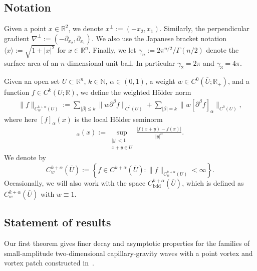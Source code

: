 \documentclass[11pt,reqno]{amsart}
\newcommand{\jbracket}[1]{\langle{#1}\rangle}
\newcommand\bdd{{\mathrm{bdd}}}
\newcommand{\R}{\mathbb{R}}
\newcommand{\n}[2][]{#1\lVert #2 #1\rVert}
\newcommand{\abs}[2][]{#1\lvert #2 #1\rvert}
\theoremstyle{plain}
\theoremstyle{remark}
\numberwithin{equation}{section}
\begin{document}
\subsection{Notation} \label{notation section}

Given a point $x \in \R^2$, we denote $x^\perp := (-x_2, x_1)$.  Similarly, the perpendicular gradient $\nabla^\perp := (-\partial_{x_2}, \partial_{x_1})$.  
We also use the Japanese bracket notation $\jbracket{x} := \sqrt{1+|x|^2}$ for $x \in \R^n$. Finally, we let $\gamma_n := 2\pi^{n/2} / \Gamma(n/2)$ denote the surface area of an $n$-dimensional unit ball. In particular $\gamma_2 = 2\pi$ and $\gamma_3 = 4\pi$. 

Given an open set $U \subset \R^n$, $k \in \mathbb{N}$, $\alpha \in (0,1)$, a weight $w \in C^0(\overline{U}; \R_+)$, and a function $f \in C^k(U;\R)$, we define the weighted H\"older norm
\begin{align*}
  \n f_{C_w^{k+\alpha}(U)}
  := \sum_{\abs \beta \le k} \n{w\partial ^\beta f}_{C^0(U)}
  + \sum_{\abs \beta = k} \n{w [\partial^\beta f]_{\alpha} }_{C^0(U)},
\end{align*}
where here $[f]_{\alpha}(x)$ is the local H\"older seminorm
\begin{align*}
  [f]_{\alpha}(x) := \sup_{\substack{\abs y < 1\\ x+y\in U}}
  \frac{\abs{f(x+y)-f(x)}}{\abs y^\alpha}.
\end{align*}
We denote by 
\[ C_w^{k+\alpha}(\overline{U}) := \left\{ f \in C^{k+\alpha}(\overline{U}) : \| f \|_{C_w^{k+\alpha}(U)} < \infty \right\}.\] 
Occasionally, we will also work with the space $C_{\bdd}^{k+\alpha}(\overline{U})$, which is defined as $C_w^{k+\alpha}(\overline{U})$ with $w \equiv 1$.  


\subsection{Statement of results} \label{results section}
Our first theorem gives finer decay and asymptotic properties for the families of small-amplitude two-dimensional capillary-gravity waves with a point vortex and vortex patch constructed in~\cite{shatah2013travelling}.   
\end{document}
